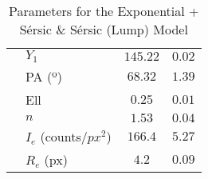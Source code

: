 \begin{table}[!htb]
\begin{tabular}{|c|l|c|c|}
                           & \(Y_{1}\)                     & \(145.22\)       & \(0.02\)                            \\
                           & PA (º)                        & \(68.32\)        & \(1.39\)                            \\
                           & Ell                           & \(0.25\)         & \(0.01\)                            \\
                           & \(n\)                         & \(1.53\)         & \(0.04\)                            \\
                           & \(I_{e}\) (counts/\(px^{2}\)) & \(166.4\)        & \(5.27\)                            \\
                           & \(R_{e}\) (px)                & \(4.2\)          & \(0.09\)                            \\
        \hline
    \end{tabular}
    \caption{Parameters for the Exponential + Sérsic \& Sérsic (Lump) Model}
    \label{tab:my_label}
\end{table}







